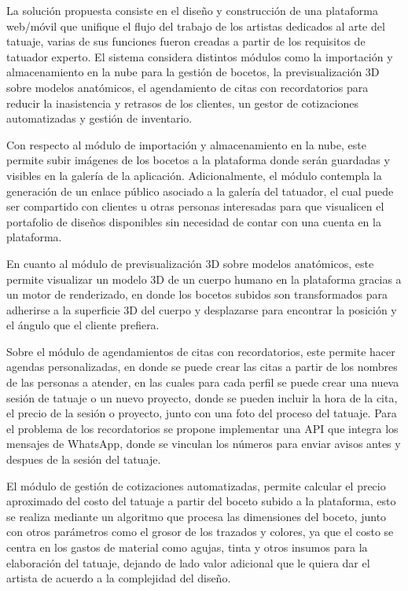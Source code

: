 \documentclass[12pt,letterpaper,oneside]{report}
\begin{document}
La solución propuesta consiste en el diseño y construcción de una plataforma web/móvil que unifique el flujo del trabajo de los artistas dedicados al arte del tatuaje, varias de sus funciones fueron creadas a partir de los requisitos de tatuador experto. El sistema considera distintos módulos como la importación y almacenamiento en la nube para la gestión de bocetos, la previsualización 3D sobre modelos anatómicos, el agendamiento de citas con recordatorios para reducir la inasistencia y retrasos de los clientes, un gestor de cotizaciones automatizadas y gestión de inventario.

Con respecto al módulo de importación y almacenamiento en la nube, este permite subir imágenes de los bocetos a la plataforma donde serán guardadas y visibles en la galería de la aplicación. Adicionalmente, el módulo contempla la generación de un enlace público asociado a la galería del tatuador, el cual puede ser compartido con clientes u otras personas interesadas para que visualicen el portafolio de diseños disponibles sin necesidad de contar con una cuenta en la plataforma.

En cuanto al módulo de previsualización 3D sobre modelos anatómicos, este permite visualizar un modelo 3D de un cuerpo humano en la plataforma gracias a un motor de renderizado, en donde los bocetos subidos son transformados para adherirse a la superficie 3D del cuerpo y desplazarse para encontrar la posición y el ángulo que el cliente prefiera.

Sobre el módulo de agendamientos de citas con recordatorios, este permite hacer agendas personalizadas, en donde se puede crear las citas a partir de los nombres de las personas a atender, en las cuales para cada perfil se puede crear una nueva sesión de tatuaje o un nuevo proyecto, donde se pueden incluir la hora de la cita, el precio de la sesión o proyecto, junto con una foto del proceso del tatuaje. Para el problema de los recordatorios se propone implementar una API que integra los mensajes de WhatsApp\cite{whatsapp}, donde se vinculan los números para enviar avisos antes y despues de la sesión del tatuaje.

El módulo de gestión de cotizaciones automatizadas, permite calcular el precio aproximado del costo del tatuaje a partir del boceto subido a la plataforma, esto se realiza mediante un algoritmo que procesa las dimensiones del boceto, junto con otros parámetros como el grosor de los trazados y colores, ya que el costo se centra en los gastos de material como agujas, tinta y otros insumos para la elaboración del tatuaje, dejando de lado valor adicional que le quiera dar el artista de acuerdo a la complejidad del diseño.
\end{document}
